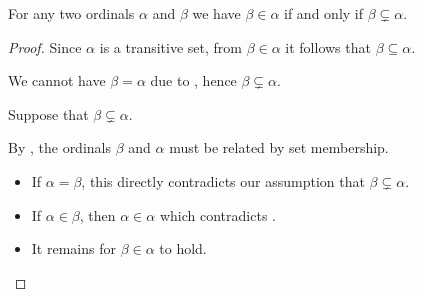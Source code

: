 \begin{proposition}\label{thm:ordinal_ordering_via_subsets}
  For any two ordinals \( \alpha \) and \( \beta \) we have \( \beta \in \alpha \) if and only if \( \beta \subsetneq \alpha \).
\end{proposition}
\begin{proof}
  \NecessitySubProof Since \( \alpha \) is a transitive set, from \( \beta \in \alpha \) it follows that \( \beta \subseteq \alpha \).

  We cannot have \( \beta = \alpha \) due to , hence \( \beta \subsetneq \alpha \).

  \SufficiencySubProof Suppose that \( \beta \subsetneq \alpha \).

  By , the ordinals \( \beta \) and \( \alpha \) must be related by set membership.
  \begin{itemize}
    \item If \( \alpha = \beta \), this directly contradicts our assumption that \( \beta \subsetneq \alpha \).
    \item If \( \alpha \in \beta \), then \( \alpha \in \alpha \) which contradicts .
    \item It remains for \( \beta \in \alpha \) to hold.
  \end{itemize}
\end{proof}

